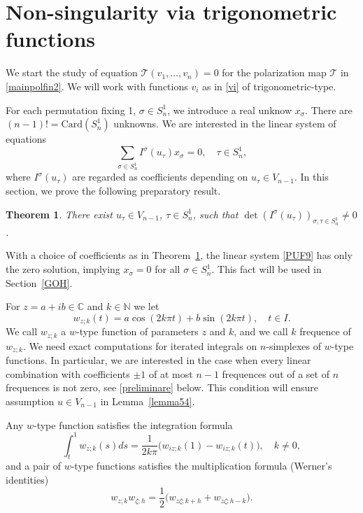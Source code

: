 \documentclass[12pt, reqno]{amsart}
\theoremstyle{plain}
\newtheorem {theorem}{Theorem}[section]
\theoremstyle{definition}
\theoremstyle{remark}
\numberwithin{equation}{section}
\newcommand{\C}{\mathbb{C}}
\newcommand{\N}{\mathbb{N}}
\newcommand{\T}{\mathcal{T}}
\newcommand{\s}{\sigma}
\newcommand{\0}{\theta}
\newcommand{\z}{\zeta}
\newcommand{\1}{{-1}}
\renewcommand{\=}{\coloneqq}
\renewcommand{\.}{\dots}
\renewcommand{\z}{\mathrm z}
\begin{document}
 
 
 
 
 
 
 
 
\section{Non-singularity via trigonometric functions}\label{NSVTF}
 
We start the study of   equation $\T(v_1,\dots,v_n)=0$ for the polarization map $\T$   in \eqref{mainpolfin2}. We will work with functions $v_i$ as in \eqref{vi} of
trigonometric-type.
 
  For each permutation fixing 1,  $\s\in S_n^1$, we introduce a real unknow $x_\s$. There are   $(n-1)!=\mathrm{Card} (S_n^1)$ unknowns.
We are interested
	 in the linear system of equations
\begin{equation}
\label{PUF9}
 \sum_{\s\in S_n^1}   I^{\sigma}(u_\tau)  x_\s=0,\quad \tau \in S_n^1,
\end{equation}
where 
$I^{\sigma}(u_\tau)$ are regarded as coefficients depending on $u_\tau \in V_{n-1}$.  In this section, we prove the following preparatory result.


\begin{theorem}\label{TRIX}
There exist $u_\tau \in V_{n-1}$,   $\tau\in S_n^1$, such that $\det( I^{\sigma}(u_\tau))_{\s,\tau\in S_n^1}\neq 0$.
\end{theorem}

With a choice of coefficients as in Theorem~\ref{TRIX}, the linear system \eqref{PUF9} has only the zero solution, implying $x_\s=0$ for all $\s\in S_n^1$. This fact will be used in Section~\ref{GOH}.

 
 For   $z=a+i b\in\C$ and $k\in\N$ we let  
 \[
        w_{z;k} (t) = a \cos (2k\pi  t) + b\sin (2k\pi t),\quad t\in I .
\]
We call $w_{z;k}$ a $w$-type function of parameters $z$ and $k$, and we call $k$ frequence of $w_{z;k}$. 
We need exact computations for iterated integrals on $n$-simplexes of $w$-type functions. 
In particular, we are interested in the case when every  linear combination  with coefficients $\pm1$ of at most $n-1$ frequences out of a set of $n$ frequences   is not  zero, see   \eqref{preliminare} below. This condition will ensure   assumption $u\in V_{n-1}$ in Lemma~\ref{lemma54}.


Any $w$-type function satisfies the integration  formula
\begin{equation}
    \label{integration}
     \int_t^1 w_{z;k}(s) ds = \frac{1}{2k\pi} \big (w_{iz;k}(1)-w_{iz;k}(t)\big) , \quad k\neq0,
     \end{equation}
     and a pair of $w$-type functions satisfies  the   multiplication formula (Werner's identities)
     \begin{equation}
    \label{multiplication}
     w_{z;k}  w_{\zeta;h}%
     =\frac 12 \big( w_{z\zeta;k+h} + w_{\bar z \zeta; h-k}\big).
\end{equation}
\end{document}
